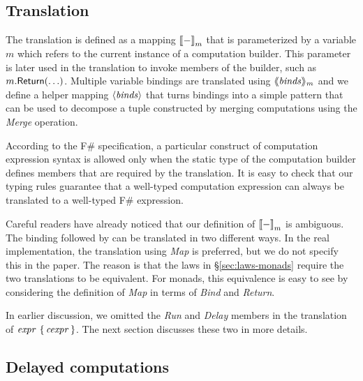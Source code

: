 \documentclass[runningheads,a4paper]{llncs}
\begin{document}

\subsection{Translation}
\label{sec:semantics-transl}

The translation is defined as a mapping $|[ - |]_m$ that is parameterized by a variable $m$ which
refers to the current instance of a computation builder. This parameter is later used in the
translation to invoke members of the builder, such as $m.\textnormal{\sffamily Return}(\ldots)$. Multiple 
variable bindings are translated using $\langle\hspace{-0.25em}\langle \textnormal{\emph{binds}} \rangle\hspace{-0.25em}\rangle_m$ and we define a helper mapping 
$\langle \textnormal{\emph{binds}} \rangle$ that turns bindings into a simple pattern that can be used to decompose a tuple
constructed by merging computations using the \emph{Merge} operation.

According to the F\# specification, a particular construct of computation expression syntax is
allowed only when the static type of the computation builder defines members that are required
by the translation. It is easy to check that our typing rules guarantee that a well-typed computation
expression can always be translated to a well-typed F\# expression.

Careful readers have already noticed that our definition of $|[ - |]_m$ is ambiguous. The 
 binding followed by  can be translated in two different ways. In the
real implementation, the translation using \emph{Map} is preferred, but we do not specify this in
the paper. The reason is that the laws in \S\ref{sec:laws-monads} require the two translations to
be equivalent. For monads, this equivalence is easy to see by considering the definition of
\emph{Map} in terms of \emph{Bind} and \emph{Return}.

In earlier discussion, we omitted the \emph{Run} and \emph{Delay} members in the translation of
$\textnormal{\emph{expr}}~\{\,\textnormal{\emph{cexpr}}\,\}$. The next section discusses these two in more details.


\subsection{Delayed computations}
\label{sec:semantics-delayed}
~
\end{document}

